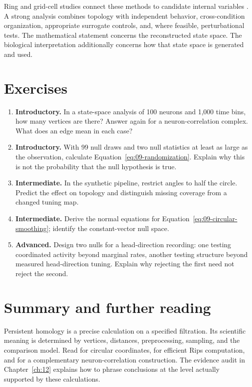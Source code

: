 Ring and grid-cell studies connect these methods to candidate internal variables \citep{app_chaudhuri2019,app_gardner2022}. A strong analysis combines topology with independent behavior, cross-condition organization, appropriate surrogate controls, and, where feasible, perturbational tests. The mathematical statement concerns the reconstructed state space. The biological interpretation additionally concerns how that state space is generated and used.

\section{Exercises}
\begin{enumerate}
\item \textbf{Introductory.} In a state-space analysis of 100 neurons and 1,000 time bins, how many vertices are there? Answer again for a neuron-correlation complex. What does an edge mean in each case?
\item \textbf{Introductory.} With 99 null draws and two null statistics at least as large as the observation, calculate Equation~\eqref{eq:09-randomization}. Explain why this is not the probability that the null hypothesis is true.
\item \textbf{Intermediate.} In the synthetic pipeline, restrict angles to half the circle. Predict the effect on topology and distinguish missing coverage from a changed tuning map.
\item \textbf{Intermediate.} Derive the normal equations for Equation~\eqref{eq:09-circular-smoothing}; identify the constant-vector null space.
\item \textbf{Advanced.} Design two nulls for a head-direction recording: one testing coordinated activity beyond marginal rates, another testing structure beyond measured head-direction tuning. Explain why rejecting the first need not reject the second.
\end{enumerate}

\section{Summary and further reading}
Persistent homology is a precise calculation on a specified filtration. Its scientific meaning is determined by vertices, distances, preprocessing, sampling, and the comparison model. Read \citet{desilva2011} for circular coordinates, \citet{app_bauer2021} for efficient Rips computation, and \citet{app_giusti2015} for a complementary neuron-correlation construction. The evidence audit in Chapter~\ref{ch:12} explains how to phrase conclusions at the level actually supported by these calculations.
